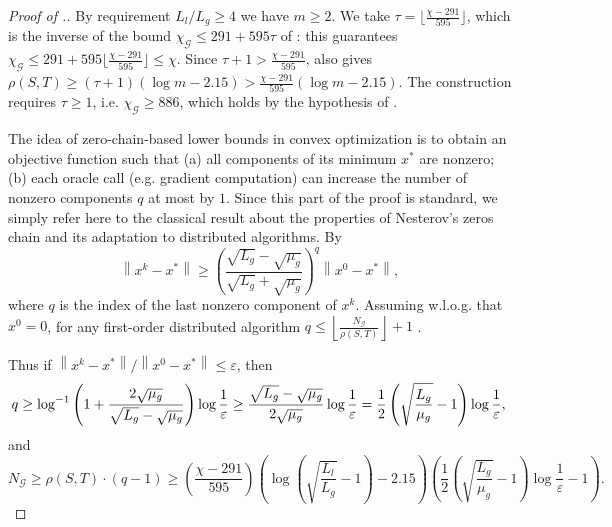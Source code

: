 \documentclass[a4paper,USenglish,cleveref, autoref, thm-restate]{lipics-v2021}
\newcommand{\eps}{\varepsilon}
\newcommand{\cG}{{\mathcal G}}
\newcommand{\norm}[1]{\left\|#1 \right\|}
\newcommand{\floor}[1]{\left\lfloor{#1}\right\rfloor}
\newcommand{\cbr}[1]{\left(#1\right)}
\begin{document}
\begin{proof}[Proof of .]
By requirement $L_l /L_g \geq 4$ we have $m\geq 2$. 
We take $\tau = \lfloor\frac{\chi - 291}{595}\rfloor$, which is the inverse of the bound $\chi_\cG \le 291 + 595\tau$ of : this guarantees $\chi_\cG \leq 291 + 595\lfloor\frac{\chi-291}{595}\rfloor \leq \chi$. Since $\tau + 1 > \frac{\chi - 291}{595}$,  also gives $\rho(S, T)\geq (\tau+1)(\log m - 2.15) > \frac{\chi - 291}{595}(\log m -2.15)$. The construction requires $\tau \geq 1$, i.e. $\chi_\cG \geq 886$, which holds by the hypothesis of .


The idea of zero-chain-based lower bounds in convex optimization is to obtain an objective function such that (a) all components of its minimum $x^*$ are nonzero; (b) each oracle call (e.g. gradient computation) can increase the number of nonzero components $q$ at most by $1$.
Since this part of the proof is standard, we simply refer here to the classical result about the properties of Nesterov's zeros chain and its adaptation to distributed algorithms.
By \cite[Theorem~2.1.13]{nesterov2004introduction}
\begin{equation}
  \norm{x^k - x^*} \geq \cbr{\frac{\sqrt{L_g} -\sqrt{\mu_g}}{\sqrt{L_g} + \sqrt{\mu_g}}}^{q} \norm{x^0 - x^*},
\end{equation}
where $q$ is the index of the last nonzero component of $x^k$. 
Assuming w.l.o.g. that $x^0 = 0$, for any first-order distributed algorithm  $q \leq {\floor{\frac{N_\cG}{\rho(S, T)}} + 1}$ \cite[Lemma 1]{scaman2017optimal}.

Thus if $\norm{x^k - x^*}/\norm{x^0 - x^*} \leq \eps$, then
\begin{equation}
  q \geq \log^{-1}\cbr{1 + \frac{2 \sqrt{\mu_g}}{\sqrt{L_g} - \sqrt{\mu_g}}}\log\frac1\eps
  \geq
 \frac{\sqrt{L_g} - \sqrt{\mu_g}}{2 \sqrt{\mu_g}}\log\frac1\eps
  =\frac12 \left(\sqrt{\frac{L_g}{\mu_g}} - 1\right)\log\frac1\eps, \\
\end{equation}
and
\begin{equation}\label{eq:NW}
N_\cG \geq \rho(S,T) \cdot(q - 1) \geq \cbr{\frac{\chi - 291}{595}}\left(\log\cbr{\sqrt{\frac{L_l}{L_g} }- 1 } -2.15\right)\cbr{\frac12 \left(\sqrt{\frac{L_g}{\mu_g}} - 1\right)\log\frac1\eps - 1}.
\end{equation}


\end{proof}
\end{document}
